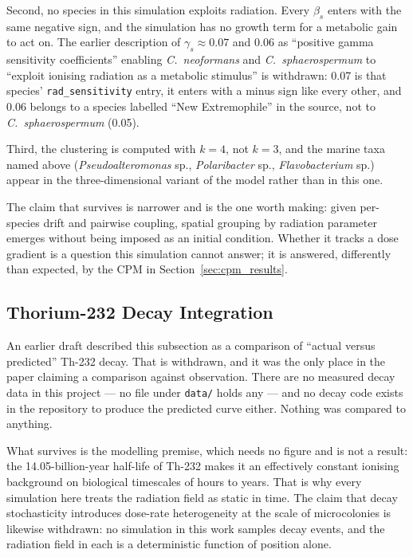 \documentclass[11pt]{article}
\begin{document}
Second, no species in this simulation exploits radiation. Every $\beta_s$ enters with the same
negative sign, and the simulation has no growth term for a metabolic gain to act on. The earlier
description of $\gamma_s \approx 0.07$ and $0.06$ as ``positive gamma sensitivity coefficients''
enabling \textit{C.\ neoformans} and \textit{C.\ sphaerospermum} to ``exploit ionising radiation as
a metabolic stimulus'' is withdrawn: 0.07 is that species' \texttt{rad\_sensitivity} entry, it
enters with a minus sign like every other, and 0.06 belongs to a species labelled ``New
Extremophile'' in the source, not to \textit{C.\ sphaerospermum} (0.05).

Third, the clustering is computed with $k = 4$, not $k = 3$, and the marine taxa named above
(\textit{Pseudoalteromonas} sp., \textit{Polaribacter} sp., \textit{Flavobacterium} sp.) appear in
the three-dimensional variant of the model rather than in this one.

The claim that survives is narrower and is the one worth making: given per-species drift and
pairwise coupling, spatial grouping by radiation parameter emerges without being imposed as an
initial condition. Whether it tracks a dose gradient is a question this simulation cannot answer;
it is answered, differently than expected, by the CPM in Section~\ref{sec:cpm_results}.

\subsection{Thorium-232 Decay Integration}

An earlier draft described this subsection as a comparison of ``actual versus predicted'' Th-232
decay. That is withdrawn, and it was the only place in the paper claiming a comparison against
observation. There are no measured decay data in this project --- no file under \texttt{data/}
holds any --- and no decay code exists in the repository to produce the predicted curve either.
Nothing was compared to anything.

What survives is the modelling premise, which needs no figure and is not a result: the
14.05-billion-year half-life of Th-232 makes it an effectively constant ionising background on
biological timescales of hours to years. That is why every simulation here treats the radiation
field as static in time. The claim that decay stochasticity introduces dose-rate heterogeneity at
the scale of microcolonies is likewise withdrawn: no simulation in this work samples decay events,
and the radiation field in each is a deterministic function of position alone.
\end{document}
